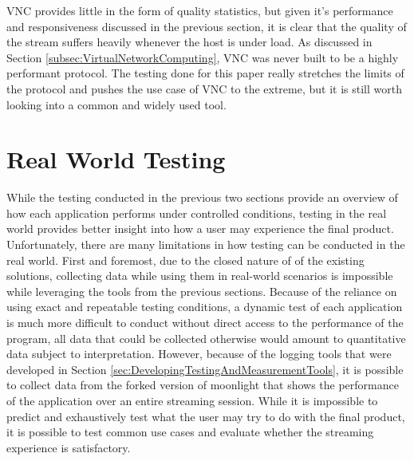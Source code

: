 VNC provides little in the form of quality statistics, but given it's performance and responsiveness discussed in the previous section, it is clear that the quality of the stream suffers heavily whenever the host is under load.
As discussed in Section \ref{subsec:VirtualNetworkComputing}, VNC was never built to be a highly performant protocol.
The testing done for this paper really stretches the limits of the protocol and pushes the use case of VNC to the extreme, but it is still worth looking into a common and widely used tool.

\section{Real World Testing}\label{sec:RealWorldTesting}

While the testing conducted in the previous two sections provide an overview of how each application performs under controlled conditions, testing in the real world provides better insight into how a user may experience the final product.
Unfortunately, there are many limitations in how testing can be conducted in the real world.
First and foremost, due to the closed nature of of the existing solutions, collecting data while using them in real-world scenarios is impossible while leveraging the tools from the previous sections.
Because of the reliance on using exact and repeatable testing conditions, a dynamic test of each application is much more difficult to conduct without direct access to the performance of the program, all data that could be collected otherwise would amount to quantitative data subject to interpretation.
However, because of the logging tools that were developed in Section \ref{sec:DevelopingTestingAndMeasurementTools}, it is possible to collect data from the forked version of moonlight that shows the performance of the application over an entire streaming session.
While it is impossible to predict and exhaustively test what the user may try to do with the final product, it is possible to test common use cases and evaluate whether the streaming experience is satisfactory.

